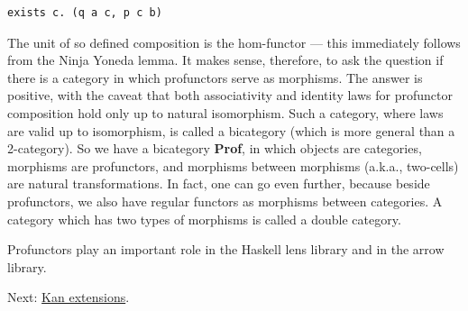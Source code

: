 \begin{verbatim}
exists c. (q a c, p c b)
\end{verbatim}

The unit of so defined composition is the hom-functor --- this
immediately follows from the Ninja Yoneda lemma. It makes sense,
therefore, to ask the question if there is a category in which
profunctors serve as morphisms. The answer is positive, with the caveat
that both associativity and identity laws for profunctor composition
hold only up to natural isomorphism. Such a category, where laws are
valid up to isomorphism, is called a bicategory (which is more general
than a 2-category). So we have a bicategory \textbf{Prof}, in which
objects are categories, morphisms are profunctors, and morphisms between
morphisms (a.k.a., two-cells) are natural transformations. In fact, one
can go even further, because beside profunctors, we also have regular
functors as morphisms between categories. A category which has two types
of morphisms is called a double category.

Profunctors play an important role in the Haskell lens library and in
the arrow library.

Next: \href{https://bartoszmilewski.com/2017/04/17/kan-extensions/}{Kan
extensions}.
